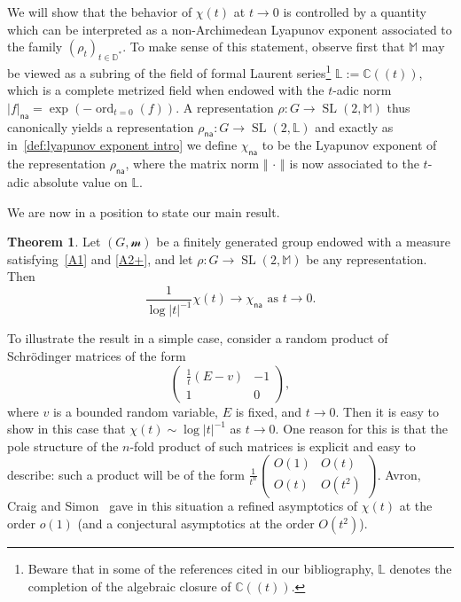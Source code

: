 \documentclass[11pt]{article}
\theoremstyle{definition}
\numberwithin{equation}{section}
\numberwithin{figure}{section}
\numberwithin{table}{section}
\DeclareMathOperator{\ord}{ord}
\DeclareMathOperator{\SL}{SL}
\newcommand{\cc}{\mathbb{C}}
\newcommand{\dD}{\mathbb{D}}
\newcommand{\sm}{\mathcal{m}}
\newcommand{\cdt}{\cc(\!(t)\!)}
\newcommand{\mm}{\mathbb{M}}
\newcommand{\cv}{\rightarrow}
\newcommand{\norm}[1]{\left\Vert#1\right\Vert}
\newcommand{\abs}[1]{\left\vert#1\right\vert}
\newcommand{\Laurent}{\mathbb{L}}
\newcommand{\unsur}[1]{\frac{1}{#1}}
\newcommand{\lrpar}[1]{\left(#1\right)}
\newcommand{\na}{\mathsf{na}}
\newcommand{\inv}{^{-1}}
\newtheorem{mthm}{Theorem}
\begin{document}
We will show that the behavior of $\chi(t)$ at $t\to 0$ is controlled by a quantity which can be interpreted as a non-Archimedean Lyapunov exponent associated to the family $(\rho_t)_{t\in \dD^*}$. To make sense of this statement, observe first that $\mm$ may be viewed as a subring of the field of formal Laurent series\footnote{Beware that in some of the references cited in our bibliography, $\Laurent$ denotes the completion of the algebraic closure of $\cdt$.} $\Laurent:=\cdt$, which is a complete metrized field when endowed with the $t$-adic norm $\abs{f}_\na = \exp(-\ord_{t=0}(f))$. A representation $\rho : G \to \SL(2,\mm)$ thus canonically yields a representation $\rho_\na : G \to \SL(2,\Laurent)$ and exactly as in~\eqref{def:lyapunov exponent intro} we define $\chi_\na$ to be the Lyapunov exponent of the representation $\rho_\na$, where the matrix norm $\norm{\,\cdot\,}$ is now associated to the $t$-adic absolute value on $\Laurent$.


We are now in a position to state our main result.

\begin{mthm}\label{Thm:lyapunov na}
Let $(G, \sm)$ be a finitely generated group endowed with a measure satisfying~\eqref{A1} and \eqref{A2+}, and let $\rho: G\to \SL(2, \mm)$ be any representation. Then
\begin{equation}
\label{eq:lyapunov na}
\unsur{{\log\abs{t}\inv}}\chi(t) \longrightarrow \chi_\na \text{ as } t\cv 0.
\end{equation}
\end{mthm}


To illustrate the result in a simple case, consider a random product of Schr\"odinger matrices of the form
\begin{equation}
\label{eq:schrodinger matrix}
\begin{pmatrix} {\unsur{t}(E-v)} & -1 \\ 1 & 0
\end{pmatrix},
\end{equation}
where $v$ is a bounded random variable, $E$ is fixed, and $t\to 0$. Then it is easy to show in this case that $\chi(t)\sim \log\abs{t}\inv$ as $t\to 0$. One reason for this is that the pole structure of the $n$-fold product of such matrices is explicit and easy to describe: such a product will be of the form $\unsur{t^n}\lrpar{
\begin{smallmatrix} O(1) & O(t) \\ O(t) & O(t^2)
\end{smallmatrix}}$.
Avron, Craig and Simon~\cite{avron-craig-simon} gave in this situation a refined asymptotics of $\chi(t)$ at the order $o(1)$ (and a conjectural asymptotics at the order $O(t^{2})$).
\end{document}

